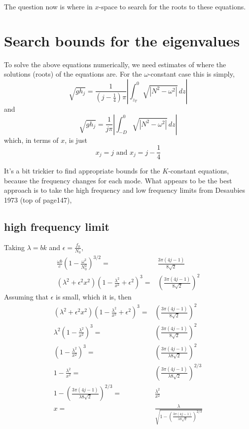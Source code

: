 \documentclass[11pt]{article}
\begin{document}
The question now is where in $x$-space to search for the roots to these equations.

%
\section{Search bounds for the eigenvalues}
%

To solve the above equations numerically, we need estimates of where the solutions (roots) of the equations are. For the $\omega$-constant case this is simply,
\begin{equation}
\sqrt{gh_j} = \frac{1}{\left(j-\frac{1}{4}\right)\pi}\left| \int_{z_T}^0 \sqrt{|N^2-\omega^2|}\,dz \right|
\end{equation}
and
\begin{equation}
\sqrt{gh_j} = \frac{1}{j \pi}\left| \int_{-D}^0 \sqrt{|N^2-\omega^2|}\,dz \right|
\end{equation}
which, in terms of $x$, is just
\begin{equation}
x_j = j \textrm{ and } x_j = j-\frac{1}{4}
\end{equation}

It's a bit trickier to find appropriate bounds for the $K$-constant equations, because the frequency changes for each mode. What appears to be the best approach is to take the high frequency and low frequency limits from Desaubies 1973 (top of page147), 

\subsection{high frequency limit}

Taking $\lambda = bk$ and $\epsilon = \frac{f_0}{N_0}$, 
\begin{align}
\frac{\omega b}{c} \left(1-\frac{\omega^2}{N_0^2} \right)^{3/2} =& \frac{3\pi(4j-1)}{8\sqrt{2}} \\
\left( \lambda^2 + \epsilon^2 x^2 \right) \left(1 - \frac{\lambda^2}{x^2} + \epsilon^2 \right)^3 =& \left( \frac{3\pi(4j-1)}{8\sqrt{2}} \right)^2 
\end{align}
Assuming that $\epsilon$ is small, which it is, then
\begin{align}
\left( \lambda^2 + \epsilon^2 x^2 \right) \left(1 - \frac{\lambda^2}{x^2} + \epsilon^2 \right)^3 =& \left( \frac{3\pi(4j-1)}{8\sqrt{2}} \right)^2 \\
\lambda^2\left(1 - \frac{\lambda^2}{x^2}  \right)^3 =& \left( \frac{3\pi(4j-1)}{8\sqrt{2}} \right)^2 \\
\left(1 - \frac{\lambda^2}{x^2}  \right)^3 =& \left( \frac{3\pi(4j-1)}{\lambda 8\sqrt{2}} \right)^2 \\
1 - \frac{\lambda^2}{x^2} =& \left( \frac{3\pi(4j-1)}{\lambda 8\sqrt{2}} \right)^{2/3} \\
1 -  \left( \frac{3\pi(4j-1)}{\lambda 8\sqrt{2}} \right)^{2/3} =&  \frac{\lambda^2}{x^2} \\
x =& \frac{\lambda}{ \sqrt{1 -  \left( \frac{3\pi(4j-1)}{\lambda 8\sqrt{2}} \right)^{2/3} }}
\end{align}
\end{document}
